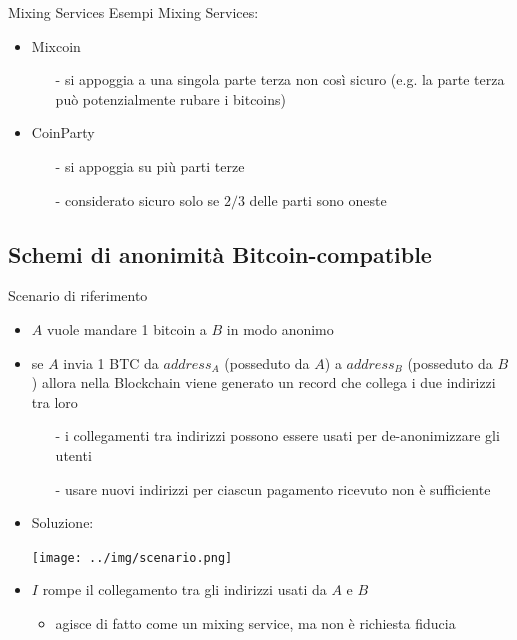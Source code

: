 \documentclass{beamer}
\begin{document}
  
  
  \begin{frame}{Mixing Services}
      Esempi Mixing Services: 
      \begin{itemize}
          \item Mixcoin
          \begin{itemize}
              \item[-] si appoggia a una singola parte terza \MVRightarrow non così sicuro (e.g. la parte terza può potenzialmente rubare i bitcoins) 
          \end{itemize}
          \item CoinParty
          \begin{itemize}
              \item[-] si appoggia su più parti terze
              \item[-] considerato sicuro solo se $2/3$ delle parti sono oneste
          \end{itemize}
      \end{itemize}
  \end{frame}
  
  
  \subsection{Schemi di anonimità Bitcoin-compatible}
  \begin{frame}{Scenario di riferimento}
      \begin{itemize}
          \item $A$ vuole mandare 1 bitcoin a $B$ in modo anonimo          \item se $A$ invia 1 BTC da $address_A$ (posseduto da $A$) a $address_B$ (posseduto da $B$) allora nella Blockchain viene generato un record che collega i due indirizzi tra loro
          \begin{itemize}
              \item[-] i collegamenti tra indirizzi possono essere usati per de-anonimizzare gli utenti
              \item[-] usare nuovi indirizzi per ciascun pagamento ricevuto non è sufficiente
          \end{itemize} \pause 
          \item Soluzione:
          \begin{minipage}{\linewidth}
            \texttt{[image: ../img/scenario.png]}
          \end{minipage}
          \item $I$ rompe il collegamento tra gli indirizzi usati da $A$ e $B$
          \begin{itemize}
              \item agisce di fatto come un mixing service, ma non è richiesta fiducia
          \end{itemize}
      \end{itemize}
  \end{frame}
  
\end{document}
